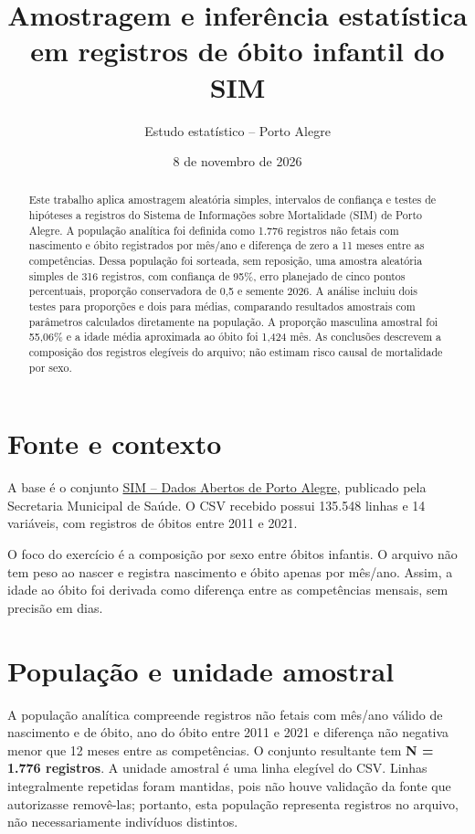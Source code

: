 \documentclass[12pt]{article}
\title{Amostragem e inferência estatística em registros de óbito infantil do SIM}
\author{Estudo estatístico -- Porto Alegre}
\date{8 de novembro de 2026}
\begin{document}
\maketitle

\begin{abstract}
Este trabalho aplica amostragem aleatória simples, intervalos de confiança e testes de hipóteses a registros do Sistema de Informações sobre Mortalidade (SIM) de Porto Alegre. A população analítica foi definida como 1.776 registros não fetais com nascimento e óbito registrados por mês/ano e diferença de zero a 11 meses entre as competências. Dessa população foi sorteada, sem reposição, uma amostra aleatória simples de 316 registros, com confiança de 95\%, erro planejado de cinco pontos percentuais, proporção conservadora de 0,5 e semente 2026. A análise incluiu dois testes para proporções e dois para médias, comparando resultados amostrais com parâmetros calculados diretamente na população. A proporção masculina amostral foi 55,06\% e a idade média aproximada ao óbito foi 1,424 mês. As conclusões descrevem a composição dos registros elegíveis do arquivo; não estimam risco causal de mortalidade por sexo.
\end{abstract}

\section{Fonte e contexto}

A base é o conjunto \href{https://dadosabertos.poa.br/dataset/mortalidade-e-obitos}{SIM -- Dados Abertos de Porto Alegre}, publicado pela Secretaria Municipal de Saúde. O CSV recebido possui 135.548 linhas e 14 variáveis, com registros de óbitos entre 2011 e 2021.

O foco do exercício é a composição por sexo entre óbitos infantis. O arquivo não tem peso ao nascer e registra nascimento e óbito apenas por mês/ano. Assim, a idade ao óbito foi derivada como diferença entre as competências mensais, sem precisão em dias.

\section{População e unidade amostral}

A população analítica compreende registros não fetais com mês/ano válido de nascimento e de óbito, ano do óbito entre 2011 e 2021 e diferença não negativa menor que 12 meses entre as competências. O conjunto resultante tem \textbf{N = 1.776 registros}. A unidade amostral é uma linha elegível do CSV. Linhas integralmente repetidas foram mantidas, pois não houve validação da fonte que autorizasse removê-las; portanto, esta população representa registros no arquivo, não necessariamente indivíduos distintos.
\end{document}
